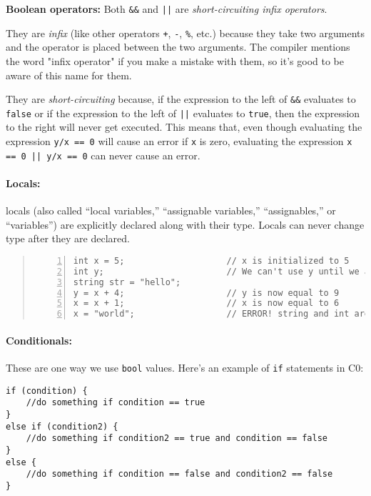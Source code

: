 \textbf{Boolean operators:} Both \lstinline'&&' and \lstinline'||' are
\emph{short-circuiting infix operators}.

They are \emph{infix} (like other operators \lstinline'+',
\lstinline'-',
\lstinline'%', etc.) because they take two arguments and the operator
is placed between the two arguments. The compiler mentions the word
"infix operator" if you make a mistake with them, so it's good to be
aware of this name for them.

They are \emph{short-circuiting} because, if the expression to the
left of \lstinline'&&' evaluates to \lstinline'false' or if the
expression to the left of \lstinline'||' evaluates to
\lstinline'true', then the expression to the right will never get
executed. This means that, even though evaluating the expression
\lstinline'y/x == 0' will cause an error if \lstinline'x' is zero,
evaluating the expression \lstinline'x == 0 || y/x == 0' can never
cause an error.

\paragraph{Locals:}
locals (also called ``local variables,'' ``assignable
variables,'' ``assignables,'' or ``variables'') are explicitly
declared along with their type.  Locals can never change type after
they are declared.
\begin{quote}\vspace*{-1ex}
\begin{lstlisting}[numbers=left]
int x = 5;                    // x is initialized to 5
int y;                        // We can't use y until we assign to it!
string str = "hello";
y = x + 4;                    // y is now equal to 9
x = x + 1;                    // x is now equal to 6
x = "world";                  // ERROR! string and int are different types!
\end{lstlisting}
\end{quote}

\paragraph{Conditionals:}
These are one way we use \lstinline'bool' values. Here's an example of
\lstinline'if' statements in C0:
\begin{lstlisting}
if (condition) {
    //do something if condition == true
}
else if (condition2) {
    //do something if condition2 == true and condition == false
}
else {
    //do something if condition == false and condition2 == false
}
\end{lstlisting}


